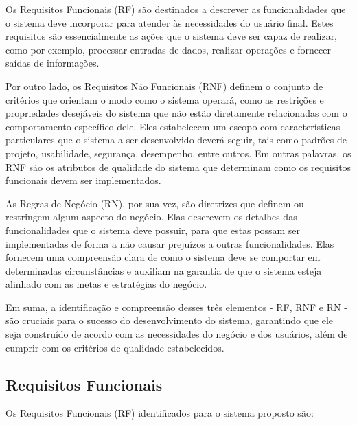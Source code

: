 Os Requisitos Funcionais (RF) são destinados a descrever as funcionalidades que o sistema deve incorporar para atender às necessidades do usuário final. Estes requisitos são essencialmente as ações que o sistema deve ser capaz de realizar, como por exemplo, processar entradas de dados, realizar operações e fornecer saídas de informações.

Por outro lado, os Requisitos Não Funcionais (RNF) definem o conjunto de critérios que orientam o modo como o sistema operará, como as restrições e propriedades desejáveis do sistema que não estão diretamente relacionadas com o comportamento específico dele. Eles estabelecem um escopo com características particulares que o sistema a ser desenvolvido deverá seguir, tais como padrões de projeto, usabilidade, segurança, desempenho, entre outros. Em outras palavras, os RNF são os atributos de qualidade do sistema que determinam como os requisitos funcionais devem ser implementados.

As Regras de Negócio (RN), por sua vez, são diretrizes que definem ou restringem algum aspecto do negócio. Elas descrevem os detalhes das funcionalidades que o sistema deve possuir, para que estas possam ser implementadas de forma a não causar prejuízos a outras funcionalidades. Elas fornecem uma compreensão clara de como o sistema deve se comportar em determinadas circunstâncias e auxiliam na garantia de que o sistema esteja alinhado com as metas e estratégias do negócio.

Em suma, a identificação e compreensão desses três elementos - RF, RNF e RN - são cruciais para o sucesso do desenvolvimento do sistema, garantindo que ele seja construído de acordo com as necessidades do negócio e dos usuários, além de cumprir com os critérios de qualidade estabelecidos.

\subsection{Requisitos Funcionais}\label{sec:requisitos-funcionais}

Os Requisitos Funcionais (RF) identificados para o sistema proposto são:

\renewcommand{\therf}{RF\arabic{rf}}

